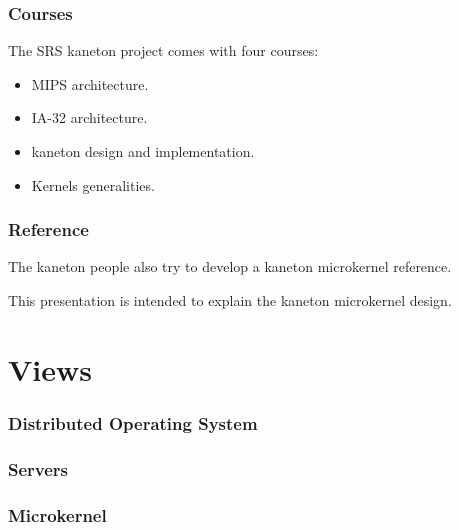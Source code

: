 
\begin{frame}
  \frametitle{Courses}

  The SRS kaneton project comes with four courses:

  \begin{itemize}[<+->]
    \item
      MIPS architecture.
    \item
      IA-32 architecture.
    \item
      kaneton design and implementation.
    \item
      Kernels generalities.
  \end{itemize}
\end{frame}


\begin{frame}
  \frametitle{Reference}

  The kaneton people also try to develop a kaneton microkernel reference.

  \-

  This presentation is intended to explain the kaneton microkernel
  design.
\end{frame}

%
%

\section{Views}


\begin{frame}
  \frametitle{Distributed Operating System}

  \begin{center}
  \end{center}
\end{frame}


\begin{frame}
  \frametitle{Servers}

  \begin{center}
  \end{center}
\end{frame}


\begin{frame}
  \frametitle{Microkernel}

  \begin{center}
  \end{center}
\end{frame}

